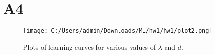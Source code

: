 \documentclass{article}
\begin{document}
\section*{A4}

\begin{figure}
    \centering
    \texttt{[image: C:/Users/admin/Downloads/ML/hw1/hw1/plot2.png]}
    \caption{Plots of learning curves for various values of \( \lambda \) and \( d \).}
    \label{fig:learning_curves}
\end{figure}
\end{document}
